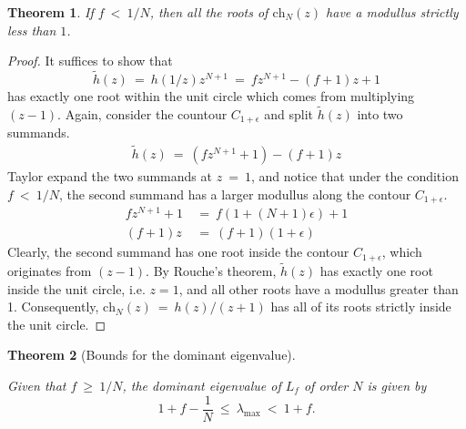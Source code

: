 \documentclass{article}
\numberwithin{equation}{section}
\newtheorem{theorem}{Theorem}
\newcommand{\ch}{\text{ch}}
\begin{document}
\begin{theorem}
    If $f \ < \ 1/N$, then all the roots of $\ch_N(z)$ have 
    a modullus strictly less than $1$. 
\end{theorem}

\begin{proof}
    It suffices to show that 
    \begin{equation}
        \widetilde h(z) \ = \ h (1/z) z^{N + 1} \ = \ fz^{N + 1} - (f+1)z+1
    \end{equation} has exactly one root within the unit circle which 
    comes from multiplying \newline $(z - 1)$. Again, consider the countour 
    $C_{1+\epsilon}$ and split $\widetilde h (z)$ into two summands. 
    \begin{align}
        \widetilde h(z) \ = \ (f z^{N + 1} + 1) - (f + 1)z
    \end{align}
    Taylor expand the two summands at $z \ = \ 1$, and notice that under the condition 
    $f \ < \ 1/N$, the second summand has a larger modullus along the 
    contour $C_{1 + \epsilon}$. 
    \begin{align}
        fz^{N + 1} + 1 & \ = \ f(1 + (N + 1)\epsilon) + 1  \\ 
        (f + 1)z & \ = \ (f + 1) (1 + \epsilon)
    \end{align} 
    Clearly, the second summand has one root inside the contour $C_{1 + \epsilon}$, 
    which originates from $(z - 1)$. By Rouche's theorem, $\widetilde h(z)$ 
    has exactly one root inside the unit circle, i.e. $z = 1$, and all 
    other roots have a modullus greater than 1. Consequently, $\ch_N(z) \ = \ h(z)/(z + 1)$ 
    has all of its roots strictly inside the unit circle.  
\end{proof}

\begin{theorem}[Bounds for the dominant eigenvalue]\label{thm:Bound}

 Given that $f \ \geq \ 1/N$, the dominant eigenvalue of $L_f$ of order 
 $N$ is given by 
 \begin{equation}
 1 + f - \frac 1 {N} \ \leq\ \lambda_{\max} \ < \ 1 + f.
 \end{equation}
\end{theorem}
\end{document}
